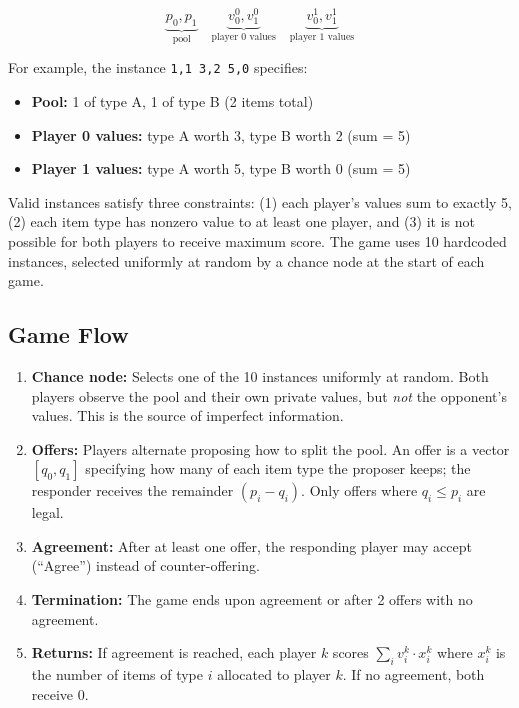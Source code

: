 \documentclass[11pt]{article}
\begin{document}
\[
\underbrace{p_0, p_1}_{\text{pool}} \quad \underbrace{v^0_0, v^0_1}_{\text{player 0 values}} \quad \underbrace{v^1_0, v^1_1}_{\text{player 1 values}}
\]

For example, the instance \texttt{1,1 3,2 5,0} specifies:
\begin{itemize}
    \item \textbf{Pool:} 1 of type A, 1 of type B (2 items total)
    \item \textbf{Player 0 values:} type A worth 3, type B worth 2 (sum = 5)
    \item \textbf{Player 1 values:} type A worth 5, type B worth 0 (sum = 5)
\end{itemize}

Valid instances satisfy three constraints: (1) each player's values sum to exactly 5, (2) each item type has nonzero value to at least one player, and (3) it is not possible for both players to receive maximum score. The game uses 10 hardcoded instances, selected uniformly at random by a chance node at the start of each game.

\subsection{Game Flow}

\begin{enumerate}
    \item \textbf{Chance node:} Selects one of the 10 instances uniformly at random. Both players observe the pool and their own private values, but \emph{not} the opponent's values. This is the source of imperfect information.
    \item \textbf{Offers:} Players alternate proposing how to split the pool. An offer is a vector $[q_0, q_1]$ specifying how many of each item type the proposer keeps; the responder receives the remainder $(p_i - q_i)$. Only offers where $q_i \leq p_i$ are legal.
    \item \textbf{Agreement:} After at least one offer, the responding player may accept (``Agree'') instead of counter-offering.
    \item \textbf{Termination:} The game ends upon agreement or after 2 offers with no agreement.
    \item \textbf{Returns:} If agreement is reached, each player $k$ scores $\sum_i v^k_i \cdot x^k_i$ where $x^k_i$ is the number of items of type $i$ allocated to player $k$. If no agreement, both receive 0.
\end{enumerate}
\end{document}
